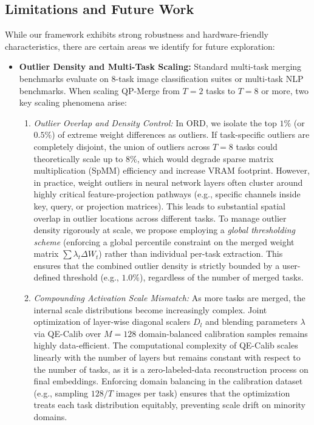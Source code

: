 \subsection{Limitations and Future Work}
While our framework exhibits strong robustness and hardware-friendly characteristics, there are certain areas we identify for future exploration:
\begin{itemize}
    \item \textbf{Outlier Density and Multi-Task Scaling:} Standard multi-task merging benchmarks evaluate on 8-task image classification suites or multi-task NLP benchmarks. When scaling QP-Merge from $T=2$ tasks to $T=8$ or more, two key scaling phenomena arise:
    \begin{enumerate}
        \item \emph{Outlier Overlap and Density Control:} In ORD, we isolate the top $1\%$ (or $0.5\%$) of extreme weight differences as outliers. If task-specific outliers are completely disjoint, the union of outliers across $T=8$ tasks could theoretically scale up to $8\%$, which would degrade sparse matrix multiplication (SpMM) efficiency and increase VRAM footprint. However, in practice, weight outliers in neural network layers often cluster around highly critical feature-projection pathways (e.g., specific channels inside key, query, or projection matrices). This leads to substantial spatial overlap in outlier locations across different tasks. To manage outlier density rigorously at scale, we propose employing a \emph{global thresholding scheme} (enforcing a global percentile constraint on the merged weight matrix $\sum \lambda_t \Delta W_t$) rather than individual per-task extraction. This ensures that the combined outlier density is strictly bounded by a user-defined threshold (e.g., $1.0\%$), regardless of the number of merged tasks.
        \item \emph{Compounding Activation Scale Mismatch:} As more tasks are merged, the internal scale distributions become increasingly complex. Joint optimization of layer-wise diagonal scalers $D_l$ and blending parameters $\lambda$ via QE-Calib over $M=128$ domain-balanced calibration samples remains highly data-efficient. The computational complexity of QE-Calib scales linearly with the number of layers but remains constant with respect to the number of tasks, as it is a zero-labeled-data reconstruction process on final embeddings. Enforcing domain balancing in the calibration dataset (e.g., sampling $128 / T$ images per task) ensures that the optimization treats each task distribution equitably, preventing scale drift on minority domains.

\end{enumerate}
\end{itemize}
